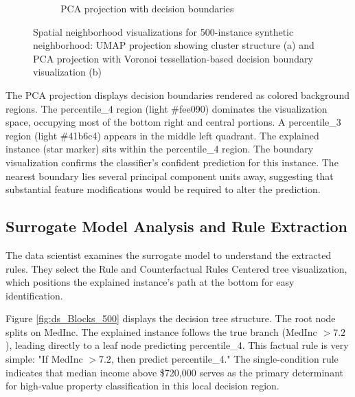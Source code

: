\begin{figure}[ht]
\begin{subfigure}[c]{0.48\textwidth}
\caption{PCA projection with decision boundaries}
\label{fig:ds_scatter_pca_500}
\end{subfigure}
\caption{Spatial neighborhood visualizations for 500-instance synthetic neighborhood: UMAP projection showing cluster structure (a) and PCA projection with Voronoi tessellation-based decision boundary visualization (b)}
\label{fig:scatter_500_comparison}
\end{figure}

The PCA projection displays decision boundaries rendered as colored background regions. The percentile\_4 region (light \#fee090) dominates the visualization space, occupying most of the bottom right and central portions. A percentile\_3 region (light \#41b6c4) appears in the middle left quadrant. The explained instance (star marker) sits within the percentile\_4 region. The boundary visualization confirms the classifier's confident prediction for this instance. The nearest boundary lies several principal component units away, suggesting that substantial feature modifications would be required to alter the prediction.

\subsection{Surrogate Model Analysis and Rule Extraction}

The data scientist examines the surrogate model to understand the extracted rules. They select the Rule and Counterfactual Rules Centered tree visualization, which positions the explained instance's path at the bottom for easy identification.

Figure \ref{fig:ds_Blocks_500} displays the decision tree structure. The root node splits on MedInc. The explained instance follows the true branch (MedInc $> 7.2$), leading directly to a leaf node predicting percentile\_4. This factual rule is very simple: "If MedInc $> 7.2$, then predict percentile\_4." The single-condition rule indicates that median income above \$720,000 serves as the primary determinant for high-value property classification in this local decision region.

